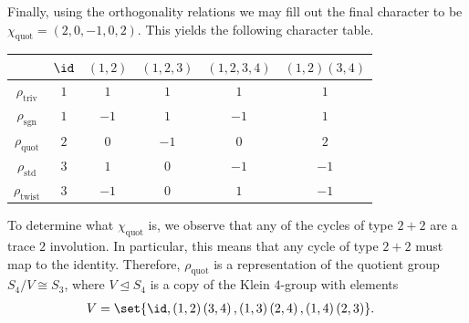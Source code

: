 \documentclass[10pt]{mypackage}
\begin{document}
\begin{example}
  Finally, using the orthogonality relations we may fill out the final character to be $\chi_{\operatorname{quot}} = \left( 2,0,-1,0,2 \right)$. This yields the following character table.
  \begin{center}
    \begin{tabular}{c|ccccc}
      & $\id$ & $\left( 1,2 \right)$ & $\left( 1,2,3 \right)$ & $\left( 1,2,3,4 \right)$ & $\left( 1,2 \right)\left( 3,4 \right)$\\
      \hline
      $\rho_{\operatorname{triv}}$ & $1$ & $1$ & $1$ & $1$ & $1$\\
      $\rho_{\operatorname{sgn}}$ & $ 1 $ & $-1$ & $1$ & $-1$ & $1$\\
      $\rho_{\operatorname{quot}}$ & $ 2 $ & $0$ & $-1$ & $0$ & $2$\\
      $\rho_{\operatorname{std}}$ & $3$ & $1$ & $0$ & $-1$ & $-1$\\
      $\rho_{\operatorname{twist}}$ & $3$ & $-1$ & $0$ & $1$ & $-1$\\
      \hline
    \end{tabular}
  \end{center}
  To determine what $\chi_{\operatorname{quot}}$ is, we observe that any of the cycles of type $2 + 2$ are a trace $2$ involution. In particular, this means that any cycle of type $2 + 2$ must map to the identity. Therefore, $\rho_{\operatorname{quot}}$ is a representation of the quotient group $S_4/V\cong S_3$, where $V\trianglelefteq S_4$ is a copy of the Klein $4$-group with elements 
  \begin{align*}
    V &= \set{\id,\left( 1,2 \right)\left( 3,4 \right),\left( 1,3 \right)\left( 2,4 \right),\left( 1,4 \right)\left( 2,3 \right)}.
  \end{align*}
\end{example}
\end{document}
